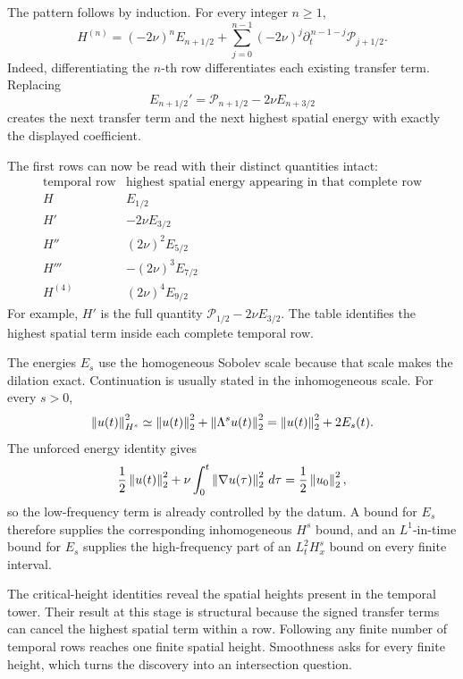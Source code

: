 The pattern follows by induction.
For every integer \(n\geq1\),
\[
  H^{(n)}
  =
  (-2\nu)^nE_{n+1/2}
  +
  \sum_{j=0}^{n-1}
  (-2\nu)^j
  \partial_t^{\,n-1-j}\mathcal P_{j+1/2}.
\]
Indeed, differentiating the \(n\)-th row differentiates each existing transfer term.
Replacing
\[
  E_{n+1/2}'
  =
  \mathcal P_{n+1/2}
  -2\nu E_{n+3/2}
\]
creates the next transfer term and the next highest spatial energy with exactly the displayed coefficient.

The first rows can now be read with their distinct quantities intact:
\[
  \begin{array}{c|c}
    \text{temporal row}
    &
    \text{highest spatial energy appearing in that complete row}
    \\
    \hline
    H
    &
    E_{1/2}
    \\
    H'
    &
    -2\nu E_{3/2}
    \\
    H''
    &
    (2\nu)^2E_{5/2}
    \\
    H'''
    &
    -(2\nu)^3E_{7/2}
    \\
    H^{(4)}
    &
    (2\nu)^4E_{9/2}
  \end{array}
\]
For example, \(H'\) is the full quantity \(\mathcal P_{1/2}-2\nu E_{3/2}\).
The table identifies the highest spatial term inside each complete temporal row.

The energies \(E_s\) use the homogeneous Sobolev scale because that scale makes the dilation exact.
Continuation is usually stated in the inhomogeneous scale.
For every \(s>0\),
\[
  \left\lVert u(t)\right\rVert_{H^s}^2
  \simeq
  \left\lVert u(t)\right\rVert_2^2
  +
  \left\lVert \Lambda^su(t)\right\rVert_2^2
  =
  \left\lVert u(t)\right\rVert_2^2+2E_s(t).
\]
The unforced energy identity gives
\[
  \frac12\left\lVert u(t)\right\rVert_2^2
  +
  \nu\int_0^t\left\lVert \nabla u(\tau)\right\rVert_2^2\,d\tau
  =
  \frac12\left\lVert u_0\right\rVert_2^2,
\]
so the low-frequency term is already controlled by the datum.
A bound for \(E_s\) therefore supplies the corresponding inhomogeneous \(H^s\) bound, and an \(L^1\)-in-time bound for \(E_s\) supplies the high-frequency part of an \(L^2_tH^s_x\) bound on every finite interval.

The critical-height identities reveal the spatial heights present in the temporal tower.
Their result at this stage is structural because the signed transfer terms can cancel the highest spatial term within a row.
Following any finite number of temporal rows reaches one finite spatial height.
Smoothness asks for every finite height, which turns the discovery into an intersection question.
